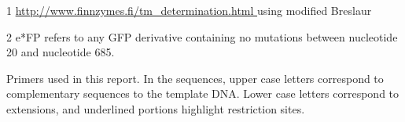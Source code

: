 \documentclass[../main.tex]{subfiles}
\begin{document}
\begin{table}[h!]
\begin{center}
\begin{threeparttable}
\begin{tablenotes}
\item [1] \url{ http://www.finnzymes.fi/tm_determination.html } using modified Breslaur 
\item [2] e*FP refers to any GFP derivative containing no mutations between nucleotide 20 and nucleotide 685.
\end{tablenotes}
\caption{Primers used in this report. In the sequences, upper case letters correspond to complementary sequences to the template DNA. Lower case letters correspond to extensions, and underlined portions highlight restriction sites.}
\end{threeparttable}
\label{tbl:primers}
\end{center}
\end{table}
\end{document}
